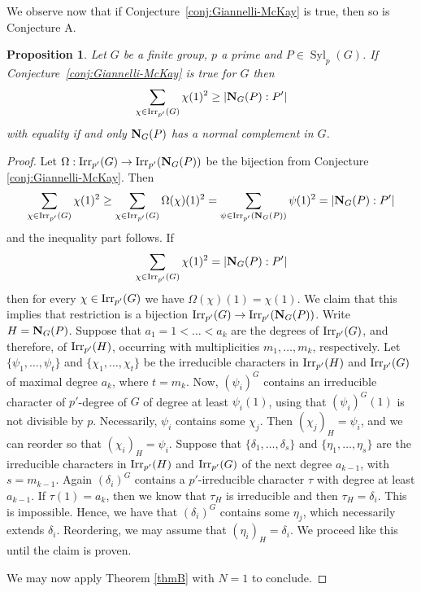 \documentclass[12pt]{amsart}
\theoremstyle{plain}
\newtheorem{pro}[thm]{Proposition}
\theoremstyle{definition}
\numberwithin{equation}{section}
\newcommand{\Syl}{\operatorname{Syl}}
\def\irrp#1{{\rm Irr}_{p'}(#1)}
\def\norm#1#2{{\bf N}_{#1}(#2)}
\begin{document}
We observe now that if Conjecture~\ref{conj:Giannelli-McKay} is
true, then so is Conjecture A.
\begin{pro}\label{pro:giannelli implies A}
Let $G$ be a finite group, $p$ a prime and $P\in\Syl_p(G)$. If
Conjecture~\ref{conj:Giannelli-McKay} is true for $G$ then
$$\sum_{\chi \in \irrp G} \chi(1)^2 \ge |\norm GP:P'|$$
   with equality if and only  $\norm GP$ has a normal complement in $G$.
\end{pro}
\begin{proof}
Let $\Omega:\irrp{G}\rightarrow\irrp{\norm G P}$ be the bijection
from Conjecture \ref{conj:Giannelli-McKay}. Then
$$\sum_{\chi \in \irrp G} \chi(1)^2 \ge \sum_{\chi\in\irrp G}
\Omega(\chi)(1)^2=\sum_{\psi\in\irrp{\norm G P}}\psi(1)^2 =|\norm
GP:P'|$$ and the inequality part follows. If $$\sum_{\chi \in \irrp
G} \chi(1)^2 =|\norm GP:P'|$$ then for every $\chi\in\irrp{G}$ we
have $\Omega(\chi)(1)=\chi(1)$. We claim  that this implies that
restriction is a bijection $\irrp{G}\rightarrow\irrp{\norm G P}$.
Write $H=\norm GP$. Suppose that $a_1=1< \ldots < a_k$ are the
degrees of $\irrp G$, and therefore, of $\irrp H$, occurring with
multiplicities $m_1, \ldots, m_k$, respectively. Let $\{\psi_1,
\ldots, \psi_{t}\}$ and $\{\chi_1, \ldots, \chi_t\}$
 be the irreducible characters in $\irrp{H}$ and $\irrp G$ of maximal degree $a_k$,
 where $t=m_k$.
 Now, $(\psi_i)^G$ contains an irreducible character of $p'$-degree of $G$ of degree at least $\psi_i(1)$,
using that $(\psi_i)^G(1)$ is not divisible by $p$.
 Necessarily, $\psi_i$ contains some $\chi_j$. Then $(\chi_j)_{H}=\psi_i$, and we can reorder
 so that $(\chi_i)_{H}=\psi_i$.
 Suppose that $\{\delta_1, \ldots, \delta_s\}$ and $\{\eta_1, \ldots, \eta_s\}$
 are the irreducible characters in $\irrp{H}$ and $\irrp G$ of the next degree $a_{k-1}$, with $s=m_{k-1}$.
 Again $(\delta_i)^G$ contains a $p'$-irreducible character $\tau$ with degree at least $a_{k-1}$.
 If $\tau(1)=a_k$, then we know that $\tau_{H}$ is irreducible and then $\tau_H=\delta_i$. This is impossible.
 Hence, we have that $(\delta_i)^G$ contains some $\eta_j$, which necessarily  extends $\delta_i$.
 Reordering, we may assume that $(\eta_i)_H=\delta_i$.  We proceed like this until the claim is proven.



We may now apply Theorem \ref{thmB} with $N=1$ to conclude.
\end{proof}
\end{document}
